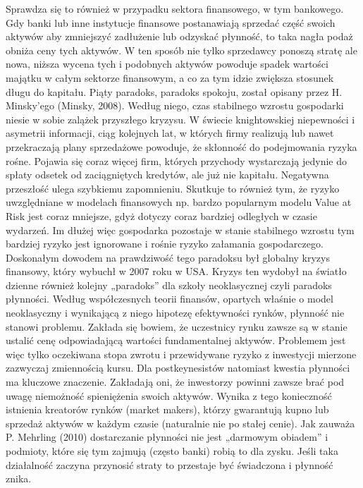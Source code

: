 \documentclass[
]{book}
\begin{document}
Sprawdza się to również w przypadku sektora finansowego, w tym bankowego. Gdy banki lub inne instytucje finansowe postanawiają sprzedać część swoich aktywów aby zmniejszyć zadłużenie lub odzyskać płynność, to taka nagła podaż obniża ceny tych aktywów. W ten sposób nie tylko sprzedawcy ponoszą stratę ale nowa, niższa wycena tych i podobnych aktywów powoduje spadek wartości majątku w całym sektorze finansowym, a co za tym idzie zwiększa stosunek długu do kapitału.
Piąty paradoks, paradoks spokoju, został opisany przez H. Minsky'ego (Minsky, 2008). Według niego, czas stabilnego wzrostu gospodarki niesie w sobie zalążek przyszłego kryzysu. W świecie knightowskiej niepewności i asymetrii informacji, ciąg kolejnych lat, w których firmy realizują lub nawet przekraczają plany sprzedażowe powoduje, że skłonność do podejmowania ryzyka rośne. Pojawia się coraz więcej firm, których przychody wystarczają jedynie do spłaty odsetek od zaciągniętych kredytów, ale już nie kapitału. Negatywna przeszłość ulega szybkiemu zapomnieniu. Skutkuje to również tym, że ryzyko uwzględniane w modelach finansowych np. bardzo popularnym modelu Value at Risk jest coraz mniejsze, gdyż dotyczy coraz bardziej odległych w czasie wydarzeń. Im dłużej więc gospodarka pozostaje w stanie stabilnego wzrostu tym bardziej ryzyko jest ignorowane i rośnie ryzyko załamania gospodarczego. Doskonałym dowodem na prawdziwość tego paradoksu był globalny kryzys finansowy, który wybuchł w 2007 roku w USA.
Kryzys ten wydobył na światło dzienne również kolejny „paradoks'' dla szkoły neoklasycznej czyli paradoks płynności. Według współczesnych teorii finansów, opartych właśnie o model neoklasyczny i wynikającą z niego hipotezę efektywności rynków, płynność nie stanowi problemu. Zakłada się bowiem, że uczestnicy rynku zawsze są w stanie ustalić cenę odpowiadającą wartości fundamentalnej aktywów. Problemem jest więc tylko oczekiwana stopa zwrotu i przewidywane ryzyko z inwestycji mierzone zazwyczaj zmiennością kursu. Dla postkeynesistów natomiast kwestia płynności ma kluczowe znaczenie. Zakładają oni, że inwestorzy powinni zawsze brać pod uwagę niemożność spieniężenia swoich aktywów. Wynika z tego konieczność istnienia kreatorów rynków (market makers), którzy gwarantują kupno lub sprzedaż aktywów w każdym czasie (naturalnie nie po stałej cenie). Jak zauważa P. Mehrling (2010) dostarczanie płynności nie jest „darmowym obiadem'' i podmioty, które się tym zajmują (często banki) robią to dla zysku. Jeśli taka działalność zaczyna przynosić straty to przestaje być świadczona i płynność znika.
\end{document}
